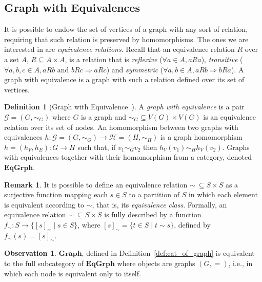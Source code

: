 \documentclass[a4paper, twoside,openright]{report}
\theoremstyle{plain}
\theoremstyle{definition}
\newtheorem{definition}[theorem]{Definition}
\newtheorem{remark}[theorem]{Remark}
\newtheorem{obs}[theorem]{Observation}
\begin{document}
\subsection{Graph with Equivalences}

It is possible to endow the set of vertices of a graph with any sort of relation, requiring that such relation is preserved by homomorphisms. The ones we are interested in are \emph{equivalence relations}. Recall that an equivalence relation $R$ over a set $A$, $R \subseteq A\times A$, is a relation that is \emph{reflexive} ($\forall a \in A, aRa$), \emph{transitive} ($\forall a, b, c \in A, aRb \text{ and } bRc \Rightarrow aRc$) and \emph{symmetric} ($\forall a, b \in A, aRb \Rightarrow bRa$). A graph with equivalence is a graph with such a relation defined over its set of vertices.

\begin{definition}[Graph with Equivalence~\cite{concur2006}]
    A \emph{graph with equivalence} is a pair $\mathcal{G} = (G, \sim_G)$ where $G$ is a graph and $\sim_G \subseteq V(G)\times V(G)$ is an equivalence relation over its set of nodes. An homomorphism between two graphs with equivalences $h :\mathcal{G} = (G, \sim_G)\rightarrow \mathcal{H} = (H, \sim_H)$ is a graph homomorphism $h = (h_V, h_E):G \rightarrow H$ such that, if $v_1 \sim_G v_2$ then $h_V(v_1) \sim_H h_V(v_2)$. Graphs with equivalences together with their homomorphism from a category, denoted $\mathbf{EqGrph}$.
\end{definition}

\begin{remark}\label{rem:eq_as_surj}
    It is possible to define an equivalence relation $\sim \ \subseteq S\times S$ as a surjective function mapping each $s \in S$ to a partition of $S$ in which each element is equivalent according to $\sim$, that is, its \emph{equivalence class}. Formally, an equivalence relation $\sim \ \subseteq S\times S$ is fully described by a function $f_\sim : S \rightarrow \{[s]_\sim \mid s \in S \}$, where $[s]_\sim = \{t \in S \mid t \sim s\}$, defined by $f_{\sim}(s) = [s]_\sim$. 
\end{remark}

\begin{obs}
    $\mathbf{Graph}$, defined in Definition~\ref{def:cat_of_graph} is equivalent to the full subcategory of $\mathbf{EqGrph}$ where objects are graphs $(G, =)$, i.e., in which each node is equivalent only to itself.
\end{obs}
\end{document}
